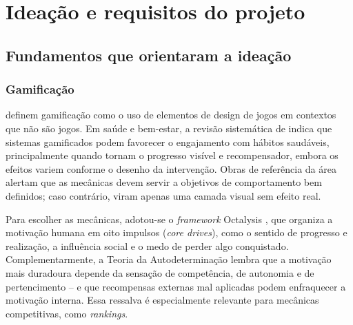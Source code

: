 %

\chapter{Ideação e requisitos do projeto}
\label{cap:requisitos}

\section{Fundamentos que orientaram a ideação}
\label{sec:fundamentos}

\subsection{Gamificação}

 definem gamificação como o uso de elementos de
design de jogos em contextos que não são jogos. Em saúde e bem-estar, a
revisão sistemática de  indica que sistemas
gamificados podem favorecer o engajamento com hábitos saudáveis,
principalmente quando tornam o progresso visível e recompensador, embora
os efeitos variem conforme o desenho da intervenção. Obras de referência
da área \cite{zichermann2011,kapp2012} alertam que as mecânicas devem
servir a objetivos de comportamento bem definidos; caso contrário, viram
apenas uma camada visual sem efeito real.

Para escolher as mecânicas, adotou-se o \textit{framework} Octalysis
\cite{chou2015}, que organiza a motivação humana em oito impulsos
(\textit{core drives}), como o sentido de progresso e realização, a
influência social e o medo de perder algo conquistado. Complementarmente,
a Teoria da Autodeterminação \cite{ryan2000} lembra que a motivação mais
duradoura depende da sensação de competência, de autonomia e de
pertencimento -- e que recompensas externas mal aplicadas podem enfraquecer
a motivação interna. Essa ressalva é especialmente relevante para
mecânicas competitivas, como \textit{rankings}.

